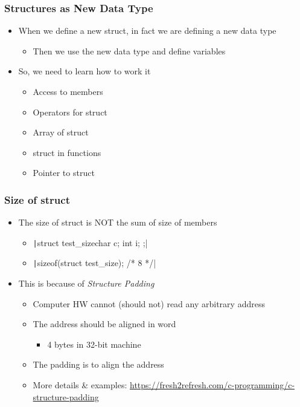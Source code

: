 \documentclass{../c-lecture}
\begin{document}
\begin{frame}
  \frametitle{Structures as New Data Type}
  \begin{itemize}
    \item
      When we define a new struct, in fact we are defining a new data type

    \begin{itemize}
      \item Then we use the new data type and define variables
    \end{itemize}
    \item So, we need to learn how to work it
    \begin{itemize}
      \item Access to members
      \item Operators for struct
      \item Array of struct
      \item struct in functions
      \item Pointer to struct
    \end{itemize}
  \end{itemize}
\end{frame}

\begin{frame}
  \frametitle{Size of struct}
  \begin{itemize}
    \item
      The size of struct is \textsc{\color{RubineRed}NOT} the sum of size of
      members

    \begin{itemize}
      \item \texttt|struct test_size{char c; int i; };|
      \item \texttt|sizeof(struct test_size); /* 8 */|
    \end{itemize}
    \item This is because of \textit{\color{YellowOrange} Structure Padding}
    \begin{itemize}
      \item Computer HW cannot (should not) read any arbitrary address
      \item The address should be aligned in word
      \begin{itemize}
        \item 4 bytes in 32-bit machine
      \end{itemize}
      \item The padding is to align the address
      \item
        More details \& examples:
        \href{Here}{https://fresh2refresh.com/c-programming/c-structure-padding}
    \end{itemize}
  \end{itemize}
\end{frame}
\end{document}
